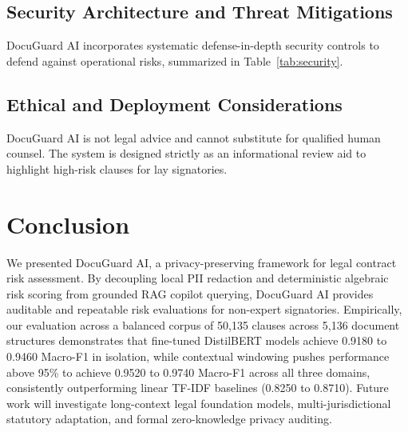 \documentclass[conference]{IEEEtran}
\begin{document}
\subsection{Security Architecture and Threat Mitigations}
DocuGuard AI incorporates systematic defense-in-depth security controls to defend against operational risks, summarized in Table~\ref{tab:security}.
\begin{table}[t]
\centering
\caption{Security Architecture and Threat Mitigations}
\label{tab:security}
\end{table}

\subsection{Ethical and Deployment Considerations}
DocuGuard AI is not legal advice and cannot substitute for qualified human counsel. The system is designed strictly as an informational review aid to highlight high-risk clauses for lay signatories.

\section{Conclusion}
We presented DocuGuard AI, a privacy-preserving framework for legal contract risk assessment. By decoupling local PII redaction and deterministic algebraic risk scoring from grounded RAG copilot querying, DocuGuard AI provides auditable and repeatable risk evaluations for non-expert signatories. Empirically, our evaluation across a balanced corpus of 50,135 clauses across 5,136 document structures demonstrates that fine-tuned DistilBERT models achieve 0.9180 to 0.9460 Macro-F1 in isolation, while contextual windowing pushes performance above 95\% to achieve 0.9520 to 0.9740 Macro-F1 across all three domains, consistently outperforming linear TF-IDF baselines (0.8250 to 0.8710). Future work will investigate long-context legal foundation models, multi-jurisdictional statutory adaptation, and formal zero-knowledge privacy auditing.



\end{document}
